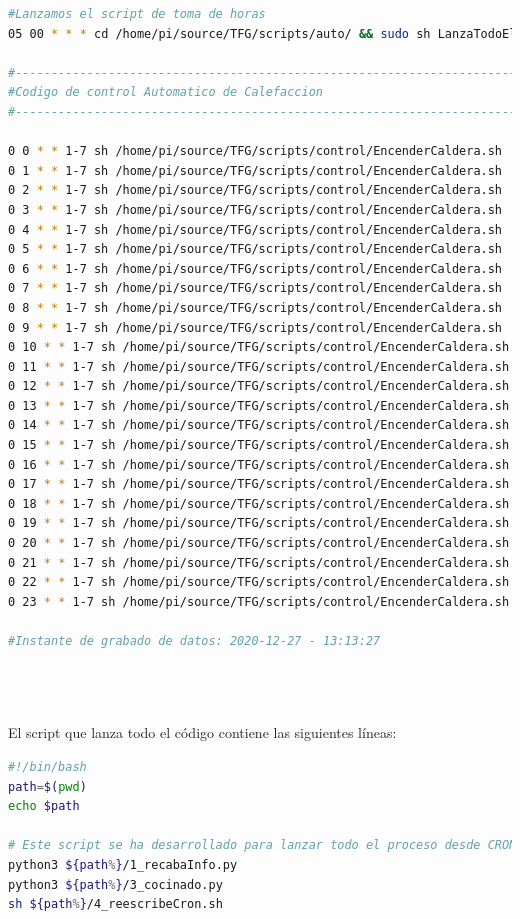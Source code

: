 \begin{lstlisting}[language=sh]
#Lanzamos el script de toma de horas
05 00 * * * cd /home/pi/source/TFG/scripts/auto/ && sudo sh LanzaTodoElProceso.sh

#--------------------------------------------------------------------------
#Codigo de control Automatico de Calefaccion 
#--------------------------------------------------------------------------
 
0 0 * * 1-7 sh /home/pi/source/TFG/scripts/control/EncenderCaldera.sh
0 1 * * 1-7 sh /home/pi/source/TFG/scripts/control/EncenderCaldera.sh
0 2 * * 1-7 sh /home/pi/source/TFG/scripts/control/EncenderCaldera.sh
0 3 * * 1-7 sh /home/pi/source/TFG/scripts/control/EncenderCaldera.sh
0 4 * * 1-7 sh /home/pi/source/TFG/scripts/control/EncenderCaldera.sh
0 5 * * 1-7 sh /home/pi/source/TFG/scripts/control/EncenderCaldera.sh
0 6 * * 1-7 sh /home/pi/source/TFG/scripts/control/EncenderCaldera.sh
0 7 * * 1-7 sh /home/pi/source/TFG/scripts/control/EncenderCaldera.sh
0 8 * * 1-7 sh /home/pi/source/TFG/scripts/control/EncenderCaldera.sh
0 9 * * 1-7 sh /home/pi/source/TFG/scripts/control/EncenderCaldera.sh
0 10 * * 1-7 sh /home/pi/source/TFG/scripts/control/EncenderCaldera.sh
0 11 * * 1-7 sh /home/pi/source/TFG/scripts/control/EncenderCaldera.sh
0 12 * * 1-7 sh /home/pi/source/TFG/scripts/control/EncenderCaldera.sh
0 13 * * 1-7 sh /home/pi/source/TFG/scripts/control/EncenderCaldera.sh
0 14 * * 1-7 sh /home/pi/source/TFG/scripts/control/EncenderCaldera.sh
0 15 * * 1-7 sh /home/pi/source/TFG/scripts/control/EncenderCaldera.sh
0 16 * * 1-7 sh /home/pi/source/TFG/scripts/control/EncenderCaldera.sh
0 17 * * 1-7 sh /home/pi/source/TFG/scripts/control/EncenderCaldera.sh
0 18 * * 1-7 sh /home/pi/source/TFG/scripts/control/EncenderCaldera.sh
0 19 * * 1-7 sh /home/pi/source/TFG/scripts/control/EncenderCaldera.sh
0 20 * * 1-7 sh /home/pi/source/TFG/scripts/control/EncenderCaldera.sh
0 21 * * 1-7 sh /home/pi/source/TFG/scripts/control/EncenderCaldera.sh
0 22 * * 1-7 sh /home/pi/source/TFG/scripts/control/EncenderCaldera.sh
0 23 * * 1-7 sh /home/pi/source/TFG/scripts/control/EncenderCaldera.sh

#Instante de grabado de datos: 2020-12-27 - 13:13:27

\end{lstlisting}

~\\~\\~\\El script que lanza todo el código contiene las siguientes líneas:

\begin{lstlisting}[language=sh, caption={Script que lanza el proceso automático completo.}]
#!/bin/bash
path=$(pwd)
echo $path

# Este script se ha desarrollado para lanzar todo el proceso desde CRON.
python3 ${path%}/1_recabaInfo.py
python3 ${path%}/3_cocinado.py
sh ${path%}/4_reescribeCron.sh
\end{lstlisting}

